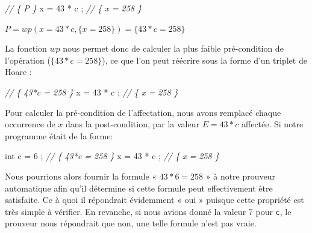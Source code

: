 \documentclass[12pt,francais,]{scrbook}
\newenvironment{Shaded}{}{}
\newcommand{\DataTypeTok}[1]{\textcolor[rgb]{0.56,0.13,0.00}{{#1}}}
\newcommand{\DecValTok}[1]{\textcolor[rgb]{0.25,0.63,0.44}{{#1}}}
\newcommand{\CommentTok}[1]{\textcolor[rgb]{0.38,0.63,0.69}{\textit{{#1}}}}
\newcommand{\NormalTok}[1]{{#1}}
\begin{document}
\begin{footnotesize}\begin{Shaded}
\begin{Highlighting}[]
\CommentTok{// \{ P \}}
\NormalTok{x = }\DecValTok{43} \NormalTok{* c ;}
\CommentTok{// \{ x = 258 \}}
\end{Highlighting}
\end{Shaded}\end{footnotesize}

\begin{center} \(P = wp(x = 43*c , \{x = 258\}) = \{43*c = 258\}\)
\end{center}

La fonction \(wp\) nous permet donc de calculer la plus faible
pré-condition de l'opération (\(\{43*c = 258\}\)), ce que l'on peut
réécrire sous la forme d'un triplet de Hoare :

\begin{footnotesize}\begin{Shaded}
\begin{Highlighting}[]
\CommentTok{// \{ 43*c = 258 \}}
\NormalTok{x = }\DecValTok{43} \NormalTok{* c ;}
\CommentTok{// \{ x = 258 \}}
\end{Highlighting}
\end{Shaded}\end{footnotesize}

Pour calculer la pré-condition de l'affectation, nous avons remplacé
chaque occurrence de \(x\) dans la post-condition, par la valeur
\(E = 43*c\) affectée. Si notre programme était de la forme:

\begin{footnotesize}\begin{Shaded}
\begin{Highlighting}[]
\DataTypeTok{int} \NormalTok{c = }\DecValTok{6} \NormalTok{;}
\CommentTok{// \{ 43*c = 258 \}}
\NormalTok{x = }\DecValTok{43} \NormalTok{* c ;}
\CommentTok{// \{ x = 258 \}}
\end{Highlighting}
\end{Shaded}\end{footnotesize}

Nous pourrions alors fournir la formule « \(43*6 = 258\) » à notre
prouveur automatique afin qu'il détermine si cette formule peut
effectivement être satisfaite. Ce à quoi il répondrait évidemment « oui
» puisque cette propriété est très simple à vérifier. En revanche, si
nous avions donné la valeur 7 pour \texttt{c}, le prouveur nous
répondrait que non, une telle formule n'est pas vraie.
\end{document}
